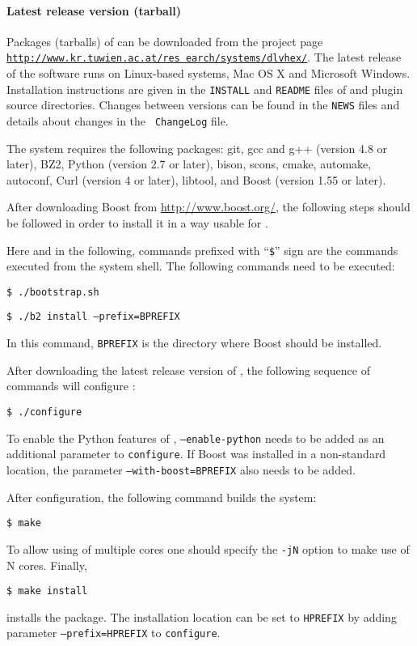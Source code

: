 \documentclass[a4paper, titlepage]{article}
\newcommand\leftaligned[1]{\par \smallskip \noindent \qquad #1 \smallskip \par}
\begin{document}
\paragraph{Latest release version (tarball)}
\label{sec:steps}
Packages (tarballs) of \dlvhex{} can be downloaded from the 
project page
\href{http://www.kr.tuwien.ac.at/research/systems/dlvhex/}%
{\tt http://www.kr.tuwien.ac.at/res earch/systems/dlvhex/}.
The latest release of the 
software runs on Linux-based systems, Mac OS X and 
Microsoft Windows. Installation instructions are given in 
the {\tt INSTALL} and {\tt README} files of \dlvhex{} 
and plugin source directories. Changes between versions can 
be found in the {\tt NEWS} files and details about changes in the {\tt 
ChangeLog} file. 

The system requires the following packages:
git, gcc and g++ (version 4.8 or later),
BZ2, Python (version 2.7 or later), bison, scons, 
cmake, automake, autoconf,
Curl (version 4 or later),
libtool, and Boost (version 1.55 or later). 

After downloading Boost from
\url{http://www.boost.org/},
the following steps should be followed in order 
to install it in a way usable for \dlvhex.

Here and in the following, commands prefixed with ``\texttt{\$}'' sign are the commands executed from the system shell.
The following commands need to be executed:
%
\leftaligned{\texttt{\$ \thinspace ./bootstrap.sh}}
%
\leftaligned{\texttt{\$ \thinspace ./b2 install --prefix=BPREFIX}}
%
In this 
command, \texttt{BPREFIX} is the directory where Boost should 
be installed. 

After downloading the latest release version of \dlvhex{},
the following sequence of commands \dlvhex{} will 
configure \dlvhex{}:
%
\leftaligned{\texttt{\$ \thinspace ./configure}} 
%
To enable the Python 
features of \dlvhex{}, \texttt{--enable-python} needs to be 
added as an additional parameter to \texttt{configure}.
%
If Boost was installed in a non-standard location,
the parameter \texttt{--with-boost=BPREFIX} also needs to be added.

After configuration, the following command builds the system:
%
\leftaligned{\texttt{\$ \thinspace make}} 
%
To allow using of multiple 
cores one should specify the \texttt{-jN} option to make 
use of N cores. Finally, 
%
\leftaligned{\texttt{\$ \thinspace make install}}
%
installs the package.
The installation location can be set to \texttt{HPREFIX}
by adding parameter \texttt{--prefix=HPREFIX} to \texttt{configure}.
   
\end{document}
